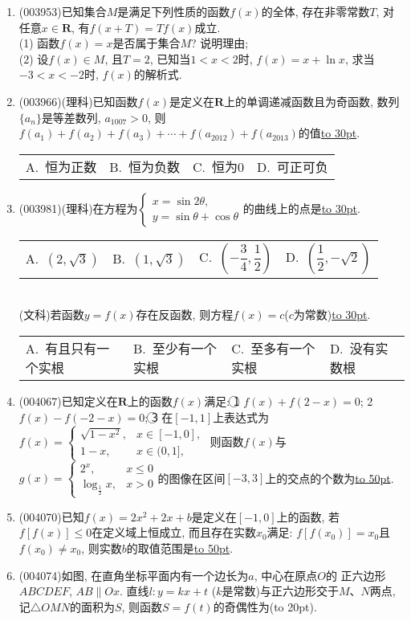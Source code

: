 \documentclass[10pt,a4paper]{article}
\newcommand{\blank}[1]{\underline{\hbox to #1pt{}}}
\newcommand{\bracket}[1]{(\hbox to #1pt{})}
\newcommand{\fourch}[4]{\par\begin{tabular}{p{.23\textwidth}p{.23\textwidth}p{.23\textwidth}p{.23\textwidth}}
A.~#1 &B.~#2& C.~#3& D.~#4
\end{tabular}}
\begin{document}
\begin{enumerate}[1.]
{}
\item {\tiny (003953)}已知集合$M$是满足下列性质的函数$f(x)$的全体, 存在非零常数$T$, 对任意$x\in \mathbf{R}$, 有$f(x+T)=Tf(x)$成立.\\
(1) 函数$f(x)=x$是否属于集合$M$? 说明理由;\\
(2) 设$f(x)\in M$, 且$T=2$, 已知当$1<x<2$时, $f(x)=x+\ln x$, 求当$-3<x<-2$时, $f(x)$的解析式.
\item {\tiny (003966)}(理科)已知函数$f(x)$是定义在$\mathbf{R}$上的单调递减函数且为奇函数, 数列$\{a_n\}$是等差数列, $a_{1007}>0$, 则$f(a_1)+f(a_2)+f(a_3)+\cdots+f(a_{2012})+f(a_{2013})$的值\blank{30}.
\fourch{恒为正数}{恒为负数}{恒为$0$}{可正可负}
\item {\tiny (003981)}(理科)在方程为$\begin{cases}
x=\sin 2\theta,\\ y=\sin\theta+\cos\theta
\end{cases}$的曲线上的点是\blank{30}.
\fourch{$(2,\sqrt{3})$}{$(1,\sqrt{3})$}{$\left(-\dfrac 34,\dfrac 12\right)$}{$\left(\dfrac 12,-\sqrt{2}\right)$}\\
(文科)若函数$y=f(x)$存在反函数, 则方程$f(x)=c$($c$为常数)\blank{30}.
\fourch{有且只有一个实根}{至少有一个实根}{至多有一个实根}{没有实数根}
\item {\tiny (004067)}已知定义在$\mathbf{R}$上的函数$f(x)$满足: \textcircled{1} $f(x)+f(2-x)=0$; \textcircled{2} $f(x)-f(-2-x)=0$; \textcircled{3} 在$[-1,1]$上表达式为$f(x)=\begin{cases} \sqrt{1-x^2}, & x\in [-1,0], \\ 1-x, & x\in (0,1], \end{cases}$ 则函数$f(x)$与$g(x)=\begin{cases} {2^x}, & x\le 0 \\ \log_\frac 12x, & x>0 \end{cases}$的图像在区间$[-3,3]$上的交点的个数为\blank{50}.
\item {\tiny (004070)}已知$f(x)=2x^2+2x+b$是定义在$[-1,0]$上的函数, 若$f[f(x)]\le 0$在定义域上恒成立, 而且存在实数$x_0$满足: $f[f(x_0)]=x_0$且$f(x_0)\ne x_0$, 则实数$b$的取值范围是\blank{50}.
\item {\tiny (004074)}如图, 在直角坐标平面内有一个边长为$a$, 中心在原点$O$的
正六边形$ABCDEF$, $AB\parallel Ox$. 直线$l:y=kx+t$ ($k$是常数)与正六边形交于$M$、$N$两点, 记$\triangle OMN$的面积为$S$, 则函数$S=f(t)$的奇偶性为\bracket{20}.

\end{enumerate}
\end{document}
